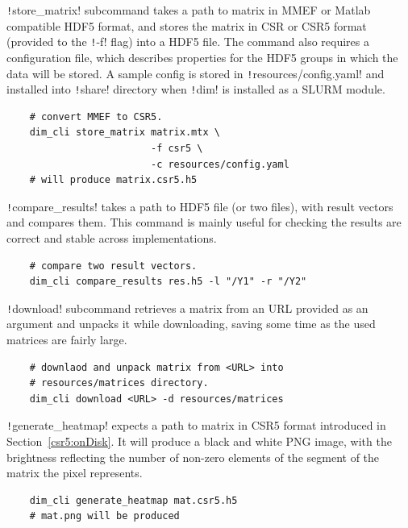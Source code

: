 \documentclass[thesis=M,english]{FITthesis}[2019/12/23]
\newcommand{\csre}[1]{\texttt!#1!}
\begin{document}
\csre{store_matrix} subcommand takes a path to matrix in MMEF or Matlab compatible HDF5 format, and stores
the matrix in CSR or CSR5 format (provided to the \csre{-f} flag) into a HDF5 file. The command also
requires a configuration file, which describes properties for the HDF5 groups in which the data will be
stored. A sample config is stored in \csre{resources/config.yaml} and installed into \csre{share} directory
when \csre{dim} is installed as a SLURM module.

\begin{verbatim}
    # convert MMEF to CSR5.
    dim_cli store_matrix matrix.mtx \
                         -f csr5 \
                         -c resources/config.yaml
    # will produce matrix.csr5.h5
\end{verbatim}

\csre{compare_results} takes a path to HDF5 file (or two files), with result vectors and compares them.
This command is mainly useful for checking the results are correct and stable across implementations.

\begin{verbatim}
    # compare two result vectors.
    dim_cli compare_results res.h5 -l "/Y1" -r "/Y2"
\end{verbatim}

\csre{download} subcommand retrieves a matrix from an URL provided as an argument and unpacks it while
downloading, saving some time as the used matrices are fairly large.

\begin{verbatim}
    # downlaod and unpack matrix from <URL> into 
    # resources/matrices directory.
    dim_cli download <URL> -d resources/matrices
\end{verbatim}

\csre{generate_heatmap} expects a path to matrix in CSR5 format introduced in Section~\ref{csr5:onDisk}.
It will produce a black and white PNG image, with the brightness reflecting the number of non-zero elements
of the segment of the matrix the pixel represents.

\begin{verbatim}
    dim_cli generate_heatmap mat.csr5.h5
    # mat.png will be produced
\end{verbatim}
\end{document}
